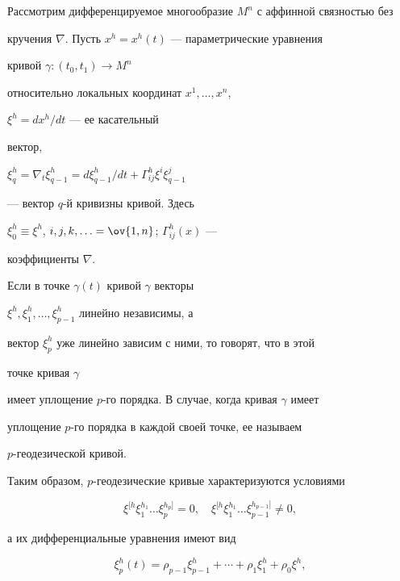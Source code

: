 Рассмотрим дифференцируемое многообразие $M^n$ с аффинной связностью без


кручения $\nabla$. Пусть $x^h=x^h(t)$ --- параметрические уравнения


кривой $\gamma:(t_0,t_1)\to M^n$


относительно локальных координат $x^1,\dotsc,x^n$,


$\xi^h=dx^h/dt$ --- ее касательный


вектор,


$\xi^h_q=\nabla_t\xi^h_{q-1}=d\xi^h_{q-1}/dt+


\Gamma^h_{ij}\xi^i\xi^j_{q-1}$


--- вектор $q$-й кривизны кривой. Здесь


$\xi^h_0\equiv\xi^h$, $i,j,k,\dotsc=\ov{1,n}$; $\Gamma^h_{ij}(x)$ ---


коэффициенты $\nabla$.





\begin{defn}


Если в точке $\gamma(t)$ кривой $\gamma$ векторы


$\xi^h,\xi^h_1,\dotsc,\xi^h_{p-1}$ линейно независимы, а


вектор $\xi^h_p$ уже линейно зависим с ними, то говорят, что в этой


точке кривая $\gamma$


имеет уплощение $p$-го порядка. В случае, когда кривая $\gamma$ имеет


уплощение $p$-го порядка в каждой своей точке, ее называем


$p$-геодезической кривой.


\end{defn}





Таким образом, $p$-геодезические кривые характеризуются условиями


$$


\xi^{[h}\xi^{h_1}_1\dots\xi^{h_p]}_p=0,\quad


\xi^{[h}\xi^{h_1}_1\dots\xi^{h_{p-1}]}_{p-1}\ne 0,


$$


а их дифференциальные уравнения имеют вид


$$


\xi^h_p(t)=\rho_{p-1}\xi^h_{p-1}+\dotsb+\rho_1


\xi^h_1+\rho_0\xi^h,


$$


